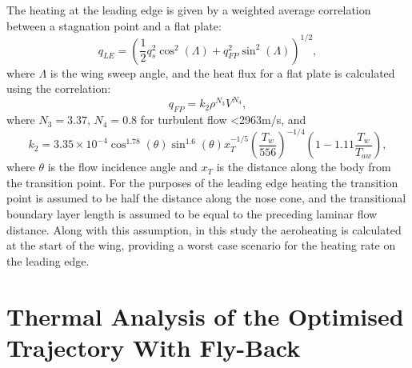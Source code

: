 The heating at the leading edge is given by a weighted average correlation between a stagnation point and a flat plate\cite{Dirkx,Tauber2008}:
\begin{equation}
q_{LE} = (\frac{1}{2}q_s^2 \cos^2(\Lambda) + q_{FP}^2 \sin^2(\Lambda))^{1/2},
\end{equation}
where $\Lambda$ is the wing sweep angle, and the heat flux for a flat plate is calculated using the correlation:
\begin{equation}
q_{FP} = k_2\rho^{N_3}V^{N_4},
\end{equation}
where $N_3 = 3.37$, $N_4 = 0.8$ for turbulent flow <2963m/s\cite{Dirkx,Tauber2008}, and
\begin{equation}
k_2 = 3.35 \times 10^{-4} \cos^{1.78}(\theta) \sin^{1.6}(\theta) x_T^{-1/5} (\frac{T_w}{556})^{-1/4} (1 - 1.11\frac{T_w}{T_{aw}}),
\end{equation}
where $\theta$ is the flow incidence angle and $x_T$ is the distance along the body from the transition point\cite{Dirkx,Tauber2008}. For the purposes of the leading edge heating the transition point is assumed to be half the distance along the nose cone, and the transitional boundary layer length is assumed to be equal to the preceding laminar flow distance. Along with this assumption, in this study the aeroheating is calculated at the start of the wing, providing a worst case scenario for the heating rate on the leading edge. 





\section{Thermal Analysis of the Optimised Trajectory With Fly-Back}
 

